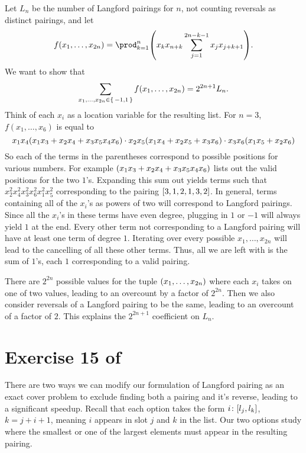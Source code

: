 \documentclass[letterpaper]{article}
\begin{document}
Let $L_{n}$ be the number of Langford pairings for $n$, not counting reversals as distinct pairings, and let
\[
    f(x_{1}, \ldots, x_{2n}) = \prod_{k = 1}^{n} \pqty{x_{k} x_{n+k} \sum_{j = 1}^{2n - k - 1} x_{j} x_{j+k+1}}.
\]
We want to show that
\[
    \sum_{x_{1}, \ldots, x_{2n} \in \set{-1, 1}} f(x_{1}, \ldots, x_{2n}) = 2^{2n + 1} L_{n}.
\]
Think of each $x_{i}$ as a location variable for the resulting list. For $n = 3$, $f(x_{1}, \ldots, x_{6})$ is equal to
\[
    x_{1} x_{4} \pqty{x_{1} x_{3} + x_{2} x_{4} + x_{3} x_{5} x_{4} x_{6}} \cdot x_{2} x_{5} \pqty{x_{1} x_{4} + x_{2} x_{5} + x_{3} x_{6}} \cdot x_{3} x_{6} \pqty{x_{1} x_{5} + x_{2} x_{6}}
\]
So each of the terms in the parentheses correspond to possible positions for various numbers.
For example $\pqty{x_{1} x_{3} + x_{2} x_{4} + x_{3} x_{5} x_{4} x_{6}}$ lists out the valid positions for the two $1$'s.
Expanding this sum out yields terms such that $x_{2}^{2} x_{4}^{2} x_{3}^{2} x_{6}^{2} x_{1}^{2} x_{5}^{2}$ corresponding to the pairing $\bqty{3, 1, 2, 1, 3, 2}$.
In general, terms containing all of the $x_{i}$'s as powers of two will correspond to Langford pairings.
Since all the $x_{i}$'s in these terms have even degree, plugging in $1$ or $-1$ will always yield $1$ at the end.
Every other term not corresponding to a Langford pairing will have at least one term of degree $1$.
Iterating over every possible $x_{1}, \ldots, x_{2n}$ will lead to the cancelling of all these other terms.
Thus, all we are left with is the sum of $1$'s, each $1$ corresponding to a valid pairing.

There are $2^{2n}$ possible values for the tuple $\pqty{x_{1}, \ldots, x_{2n}}$ where each $x_{i}$ takes on one of two values, leading to an overcount by a factor of $2^{2n}$.
Then we also consider reversals of a Langford pairing to be the same, leading to an overcount of a factor of $2$.
This explains the $2^{2n + 1}$ coefficient on $L_{n}$.

\clearpage

\section*{Exercise 15 of \cite[Chapter~7.2.2.1]{TAOCP4B}}

There are two ways we can modify our formulation of Langford pairing as an exact cover problem to exclude finding both a pairing and it's reverse, leading to a significant speedup.
Recall that each option takes the form $i\colon \bqty{l_{j}, l_{k}}$, $k = j + i + 1$, meaning $i$ appears in slot $j$ and $k$ in the list.
Our two options study where the smallest or one of the largest elements must appear in the resulting pairing.
\end{document}
